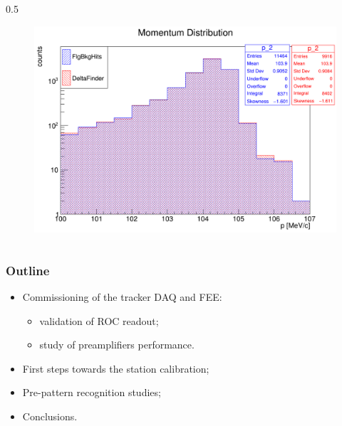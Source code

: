 \documentclass{beamer}
\begin{document}
\begin{frame}
\begin{columns}
\begin{column}{0.5\framewidth}
\begin{figure}[!h]
        \includegraphics[width =1.1\columnwidth]{figures/png/Screenshot_20240820_160904.png}
       \label{fig:momhits}
\end{figure}
        \end{column}
    \end{columns}
     
\end{frame}







\begin{frame}
    \frametitle{Outline}
    
\begin{itemize}
\item \textcolor{mygray}{Commissioning of the tracker DAQ and FEE:}
\begin{itemize}
         \vspace{2mm}

    \item \textcolor{mygray}{validation of ROC readout;}
             \vspace{1.5mm}

    \item \textcolor{mygray}{study of preamplifiers performance}.
\end{itemize}
\vspace{4mm}
    \item \textcolor{mygray}{First steps towards the station calibration;}
    \vspace{6mm}

    \item \textcolor{mygray}{Pre-pattern recognition studies;}
  \vspace{6mm}
    \item Conclusions.
\end{itemize}
\end{frame}
\end{document}
